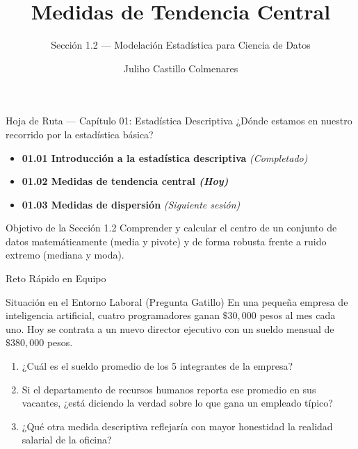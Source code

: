 \documentclass[10pt,aspectratio=169]{beamer}
\title{Medidas de Tendencia Central}
\subtitle{Sección 1.2 — Modelación Estadística para Ciencia de Datos}
\author[J. Castillo Colmenares]{Juliho Castillo Colmenares}
\institute{Tecnológico de Monterrey}
\date{}
\begin{document}
\begin{frame}[plain]
  \vspace{-0.8cm}
  \titlepage
\end{frame}

\begin{frame}{Hoja de Ruta — Capítulo 01: Estadística Descriptiva}
  ¿Dónde estamos en nuestro recorrido por la estadística básica? \pause
  \begin{itemize}
    \item \textbf{01.01 Introducción a la estadística descriptiva} \emph{(Completado)} \pause
    \item \color{TecRojo}\textbf{01.02 Medidas de tendencia central \emph{(Hoy)}}\color{black} \pause
    \item \textbf{01.03 Medidas de dispersión} \emph{(Siguiente sesión)}
  \end{itemize}
  \vspace{1em}
  \begin{block}{Objetivo de la Sección 1.2}
    Comprender y calcular el centro de un conjunto de datos matemáticamente (media y pivote) y de forma robusta frente a ruido extremo (mediana y moda).
  \end{block}
\end{frame}

\begin{frame}{Reto Rápido en Equipo}
  \begin{alertblock}{Situación en el Entorno Laboral (Pregunta Gatillo)}
    En una pequeña empresa de inteligencia artificial, cuatro programadores ganan $\$30,000$ pesos al mes cada uno. Hoy se contrata a un nuevo director ejecutivo con un sueldo mensual de $\$380,000$ pesos.
    \vspace{0.6em}
    \begin{enumerate}
      \item ¿Cuál es el sueldo promedio de los 5 integrantes de la empresa? \pause
      \item Si el departamento de recursos humanos reporta ese promedio en sus vacantes, ¿está diciendo la verdad sobre lo que gana un empleado típico? \pause
      \item ¿Qué otra medida descriptiva reflejaría con mayor honestidad la realidad salarial de la oficina?
    \end{enumerate}
  \end{alertblock}
\end{frame}
\end{document}
